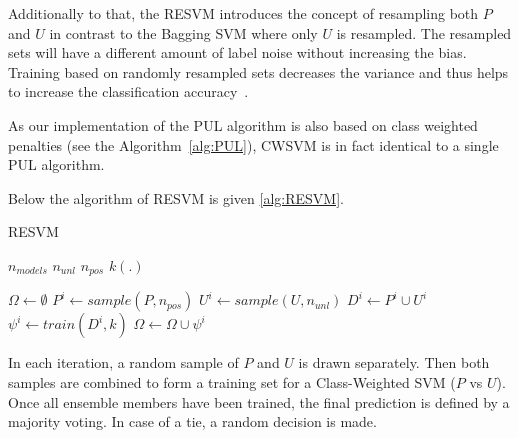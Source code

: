 Additionally to that, the RESVM introduces the concept of resampling both \(P\) and \(U\) in contrast to the Bagging SVM where only \(U\) is resampled. The resampled sets will have a different amount of label noise without increasing the bias. Training based on randomly resampled sets decreases the variance and thus helps to increase the classification accuracy~\cite{journals/ml/Breiman00}.

As our implementation of the PUL algorithm is also based on class weighted penalties (see the Algorithm~\ref{alg:PUL}), CWSVM is in fact identical to a single PUL algorithm.

Below the algorithm of RESVM is given \ref{alg:RESVM}.

\begin{algorithm}[h!]                      
\caption{RESVM} 
\label{alg:RESVM}
\begin{algorithmic}[0]
        \State $ n_{models}  $ 
         \State $ n_{unl}  $ 
        \State $ n_{pos}  $  
        \State $ k(.)  $  
        
\end{algorithmic}
    \begin{algorithmic}[1]
       \State $\Omega    \gets \emptyset$  
            \State $P^i \gets sample(P,n_{pos}) $ 
            \State $U^i \gets sample(U,n_{unl}) $ 
            \State $ D^i \gets  P^i \cup U^i$ 
            \State $\psi^i \gets train(D^i,k) $ 
            \State $\Omega \gets \Omega \cup \psi^i $ 
   \end{algorithmic}
\end{algorithm}

In each iteration, a random sample of \(P\) and \(U\) is drawn separately. Then both samples are combined to form a training set for a Class-Weighted SVM (\(P\) vs \(U\)). Once all ensemble members have been trained, the final prediction is defined by a majority voting. In case of a tie, a random decision is made.


